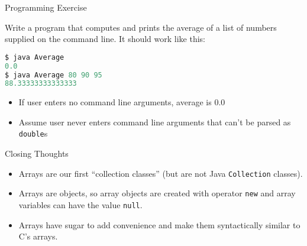 \documentclass{beamer}
\begin{document}
\begin{frame}[fragile]{Programming Exercise}


Write a program that computes and prints the average of a list of numbers supplied on the command line.  It should work like this:
\begin{lstlisting}[language=Java]
$ java Average
0.0
$ java Average 80 90 95
88.33333333333333
\end{lstlisting}

\begin{itemize}
\item If user enters no command line arguments, average is 0.0
\item Assume user never enters command line arguments that can't be parsed as {\tt double}s
\end{itemize}


\end{frame}


\begin{frame}[fragile]{Closing Thoughts}

\begin{itemize}
\item Arrays are our first ``collection classes'' (but are not Java {\tt Collection} classes).
\item Arrays are objects, so array objects are created with operator {\tt new} and array variables can have the value {\tt null}.
\item Arrays have sugar to add convenience and make them syntactically similar to C's arrays.
\end{itemize}


\end{frame}







\end{document}
